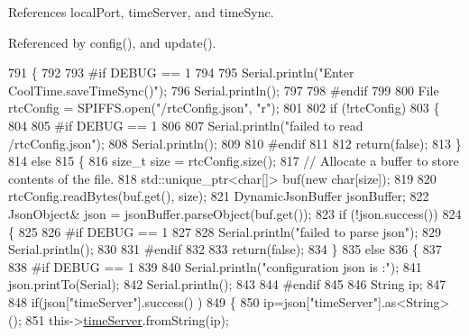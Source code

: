 References local\+Port, time\+Server, and time\+Sync.



Referenced by config(), and update().


\begin{DoxyCode}
791 \{
792 
793 \textcolor{preprocessor}{#if DEBUG == 1}
794 
795     Serial.println(\textcolor{stringliteral}{"Enter CoolTime.saveTimeSync()"});
796     Serial.println();
797 
798 \textcolor{preprocessor}{#endif }
799 
800     File rtcConfig = SPIFFS.open(\textcolor{stringliteral}{"/rtcConfig.json"}, \textcolor{stringliteral}{"r"});
801 
802     \textcolor{keywordflow}{if} (!rtcConfig) 
803     \{
804     
805 \textcolor{preprocessor}{    #if DEBUG == 1}
806 
807         Serial.println(\textcolor{stringliteral}{"failed to read /rtcConfig.json"});
808         Serial.println();
809     
810 \textcolor{preprocessor}{    #endif }
811 
812         \textcolor{keywordflow}{return}(\textcolor{keyword}{false});
813     \}
814     \textcolor{keywordflow}{else}
815     \{
816         \textcolor{keywordtype}{size\_t} size = rtcConfig.size();
817         \textcolor{comment}{// Allocate a buffer to store contents of the file.}
818         std::unique\_ptr<char[]> buf(\textcolor{keyword}{new} \textcolor{keywordtype}{char}[size]);
819 
820         rtcConfig.readBytes(buf.get(), size);
821         DynamicJsonBuffer jsonBuffer;
822         JsonObject& json = jsonBuffer.parseObject(buf.get());
823         \textcolor{keywordflow}{if} (!json.success()) 
824         \{
825         
826 \textcolor{preprocessor}{        #if DEBUG == 1}
827 
828             Serial.println(\textcolor{stringliteral}{"failed to parse json"});
829             Serial.println();
830         
831 \textcolor{preprocessor}{        #endif }
832             
833             \textcolor{keywordflow}{return}(\textcolor{keyword}{false});
834         \} 
835         \textcolor{keywordflow}{else}
836         \{
837         
838 \textcolor{preprocessor}{        #if DEBUG == 1 }
839     
840             Serial.println(\textcolor{stringliteral}{"configuration json is :"});
841             json.printTo(Serial);
842             Serial.println();
843         
844 \textcolor{preprocessor}{        #endif }
845 
846             String ip;
847             
848             \textcolor{keywordflow}{if}(json[\textcolor{stringliteral}{"timeServer"}].success() )
849             \{           
850                  ip=json[\textcolor{stringliteral}{"timeServer"}].as<String>();
851                 this->\hyperlink{classCoolTime_ad2b9858f399108cb440dd1e908916f04}{timeServer}.fromString(ip);

\end{DoxyCode}
